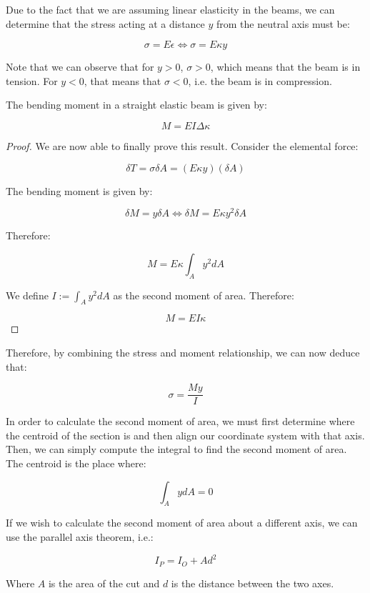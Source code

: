 \documentclass{article}
\begin{document}
\begin{proposition}
    Due to the fact that we are assuming linear elasticity in the beams, we can determine that the stress acting at a distance $y$ from the neutral axis must be:

    \[ \sigma = E\epsilon \iff \sigma = E\kappa y \]

    Note that we can observe that for $y > 0$, $\sigma > 0$, which means that the beam is in tension. For $y < 0$, that means that $\sigma < 0$, i.e. the beam is in compression.
\end{proposition}

\begin{proposition}
    The bending moment in a straight elastic beam is given by:

    \[ M = EI\Delta\kappa \]
\end{proposition}

\begin{proof}
    We are now able to finally prove this result. Consider the elemental force:

    \[ \delta T = \sigma \delta A = (E\kappa y)(\delta A) \]

    The bending moment is given by:

    \[ \delta M = y \delta A \iff \delta M = E\kappa y^2\delta A \]

    Therefore:

    \[ M = E\kappa \int_A y^2 dA \]

    We define $I := \int_A y^2dA$ as the second moment of area. Therefore:

    \[ M = EI\kappa \]
\end{proof}

Therefore, by combining the stress and moment relationship, we can now deduce that:

\[ \sigma = \frac{My}{I} \]

\begin{proposition}
    In order to calculate the second moment of area, we must first determine where the centroid of the section is and then align our coordinate system with that axis. Then, we can simply compute the integral to find the second moment of area. The centroid is the place where:

    \[ \int_A ydA = 0 \]
\end{proposition}

\begin{proposition}
    If we wish to calculate the second moment of area about a different axis, we can use the parallel axis theorem, i.e.:

    \[ I_P = I_O + Ad^2 \]

    Where $A$ is the area of the cut and $d$ is the distance between the two axes.
\end{proposition}
\end{document}

